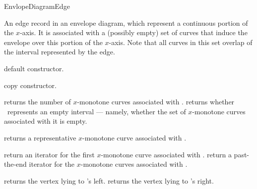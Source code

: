 
\ccRefPageBegin

\begin{ccRefConcept}{EnvlopeDiagramEdge}

\ccDefinition

An edge record in an envelope diagram, which represent a continuous portion
of the $x$-axis. It is associated with a (possibly empty) set of curves that
induce the envelope over this portion of the $x$-axis. Note that all curves
in this set overlap of the interval represented by the edge.

\ccTypes



\ccCreation
{}

    {default constructor.}
    
    {copy constructor.}

\ccAccessFunctions

    {returns the number of $x$-monotone curves associated with \ccVar.}
\ccGlue
{}
    {returns whether \ccVar\ represents an empty interval --- namely, whether the set of $x$-monotone curves associated with it is empty.}

    {returns a representative $x$-monotone curve associated with \ccVar.
     }

    {return an iterator for the first $x$-monotone curve associated with \ccVar.}
\ccGlue
{}
    {return a past-the-end iterator for the $x$-monotone curves associated with \ccVar.}

    {returns the vertex lying to \ccVar's left.}
\ccGlue
{}
    {returns the vertex lying to \ccVar's right.}


\end{ccRefConcept}
